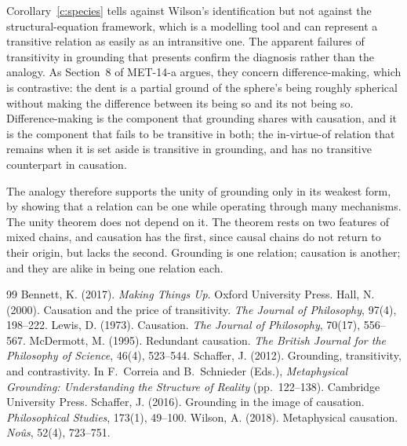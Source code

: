 \documentclass{situationist-preprint}
\begin{document}
Corollary~\ref{c:species} tells against Wilson's identification but not against the structural-equation framework, which is a modelling tool and can represent a transitive relation as easily as an intransitive one. The apparent failures of transitivity in grounding that \citet{Schaffer2012} presents confirm the diagnosis rather than the analogy. As Section~8 of MET-14-a argues, they concern difference-making, which is contrastive: the dent is a partial ground of the sphere's being roughly spherical without making the difference between its being so and its not being so. Difference-making is the component that grounding shares with causation, and it is the component that fails to be transitive in both; the in-virtue-of relation that remains when it is set aside is transitive in grounding, and has no transitive counterpart in causation.

The analogy therefore supports the unity of grounding only in its weakest form, by showing that a relation can be one while operating through many mechanisms. The unity theorem does not depend on it. The theorem rests on two features of mixed chains, and causation has the first, since causal chains do not return to their origin, but lacks the second. Grounding is one relation; causation is another; and they are alike in being one relation each.

\begin{thebibliography}{99}\small
{} Bennett, K. (2017). \emph{Making Things Up}. Oxford University Press.
 Hall, N. (2000). Causation and the price of transitivity. \emph{The Journal of Philosophy}, 97(4), 198--222.
 Lewis, D. (1973). Causation. \emph{The Journal of Philosophy}, 70(17), 556--567.
 McDermott, M. (1995). Redundant causation. \emph{The British Journal for the Philosophy of Science}, 46(4), 523--544.
 Schaffer, J. (2012). Grounding, transitivity, and contrastivity. In F.~Correia and B.~Schnieder (Eds.), \emph{Metaphysical Grounding: Understanding the Structure of Reality} (pp.~122--138). Cambridge University Press.
 Schaffer, J. (2016). Grounding in the image of causation. \emph{Philosophical Studies}, 173(1), 49--100.
 Wilson, A. (2018). Metaphysical causation. \emph{No\^us}, 52(4), 723--751.
\end{thebibliography}
\end{document}
